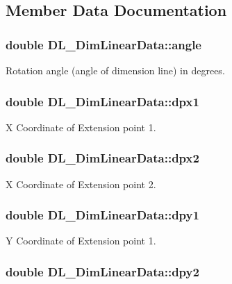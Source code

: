 \subsection{Member Data Documentation}
\hypertarget{structDL__DimLinearData_a49ff532b4d57c9b3cdff9279224f569d}{
\subsubsection[{angle}]{\setlength{\rightskip}{0pt plus 5cm}double D\-L\-\_\-\-Dim\-Linear\-Data\-::angle}}\label{structDL__DimLinearData_a49ff532b4d57c9b3cdff9279224f569d}
Rotation angle (angle of dimension line) in degrees. \hypertarget{structDL__DimLinearData_a82ea128585a3707c9dfc1ed492963af6}{
\subsubsection[{dpx1}]{\setlength{\rightskip}{0pt plus 5cm}double D\-L\-\_\-\-Dim\-Linear\-Data\-::dpx1}}\label{structDL__DimLinearData_a82ea128585a3707c9dfc1ed492963af6}
X Coordinate of Extension point 1. \hypertarget{structDL__DimLinearData_a132aa83245ff50b1b4f60b60667ca5a1}{
\subsubsection[{dpx2}]{\setlength{\rightskip}{0pt plus 5cm}double D\-L\-\_\-\-Dim\-Linear\-Data\-::dpx2}}\label{structDL__DimLinearData_a132aa83245ff50b1b4f60b60667ca5a1}
X Coordinate of Extension point 2. \hypertarget{structDL__DimLinearData_ac92bccc41c8a3e1016bae89282dbc1cc}{
\subsubsection[{dpy1}]{\setlength{\rightskip}{0pt plus 5cm}double D\-L\-\_\-\-Dim\-Linear\-Data\-::dpy1}}\label{structDL__DimLinearData_ac92bccc41c8a3e1016bae89282dbc1cc}
Y Coordinate of Extension point 1. \hypertarget{structDL__DimLinearData_a4076706ef2191719f778db806bc60217}{
\subsubsection[{dpy2}]{\setlength{\rightskip}{0pt plus 5cm}double D\-L\-\_\-\-Dim\-Linear\-Data\-::dpy2}}\label{structDL__DimLinearData_a4076706ef2191719f778db806bc60217}
